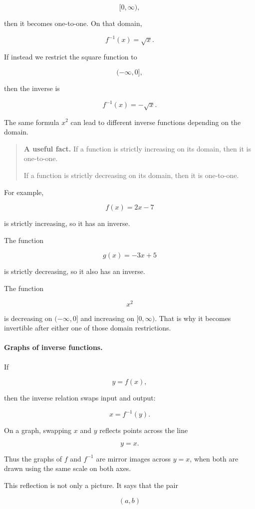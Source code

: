 \[
[0,\infty),
\]

then it becomes one-to-one. On that domain,

\[
f^{-1}(x)=\sqrt{x}.
\]

If instead we restrict the square function to

\[
(-\infty,0],
\]

then the inverse is

\[
f^{-1}(x)=-\sqrt{x}.
\]

The same formula \(x^2\) can lead to different inverse functions depending on the domain.

\begin{quote}
\textbf{A useful fact.}
If a function is strictly increasing on its domain, then it is one-to-one.

If a function is strictly decreasing on its domain, then it is one-to-one.
\end{quote}

For example,

\[
f(x)=2x-7
\]

is strictly increasing, so it has an inverse.

The function

\[
g(x)=-3x+5
\]

is strictly decreasing, so it also has an inverse.

The function

\[
x^2
\]

is decreasing on \((-\infty,0]\) and increasing on \([0,\infty)\). That is why it becomes invertible after either one of those domain restrictions.

\paragraph{Graphs of inverse functions.}
If

\[
y=f(x),
\]

then the inverse relation swaps input and output:

\[
x=f^{-1}(y).
\]

On a graph, swapping \(x\) and \(y\) reflects points across the line

\[
y=x.
\]

Thus the graphs of \(f\) and \(f^{-1}\) are mirror images across \(y=x\), when both are drawn using the same scale on both axes.

This reflection is not only a picture. It says that the pair

\[
(a,b)
\]

